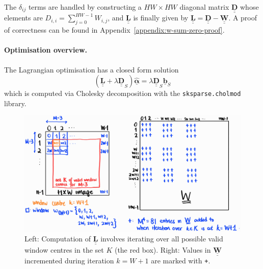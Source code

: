 \documentclass{article}
\theoremstyle{definition}
\def\vt#1{\underline{\mathbf{#1}}}
\def\vts#1{\underline{\boldsymbol{#1}}}
\def\mt#1{\underline{\underline{\mathbf{#1}}}}
\def\mts#1{\underline{\underline{\boldsymbol{#1}}}}
\begin{document}
\begin{multicols}{2}[]



The $\delta_{ij}$ terms are handled by constructing a $HW\times HW$ diagonal matrix $\mt D$ whose elements are $D_{i,i} = \sum_{j=0}^{HW-1} W_{i,j}$, and $\mt L$ is finally given by $\mt L = \mt D - \mt W$. A proof of correctness can be found in Appendix~\ref{appendix:w-sum-zero-proof}.

\paragraph{Optimisation overview.}
The Lagrangian optimisation has a closed form solution
$$\left(\mt L + \lambda \mt D_S\right) \hat{\vts \alpha} = \lambda \mt D_S \vt b_S$$
which is computed via Cholesky decomposition with the \verb|sksparse.cholmod| library.

\begin{figure}[H]
    \centering
    \includegraphics[width=\columnwidth]{index-displacement}
    \caption{Left: Computation of $\mt L$ involves iterating over all possible valid window centres in the set $K$ (the red box). Right: Values in $\mt W$ incremented during iteration $k=W+1$ are marked with \texttt{+}.}
    \label{fig:index-displacement}
\end{figure}





\end{multicols}
\end{document}
